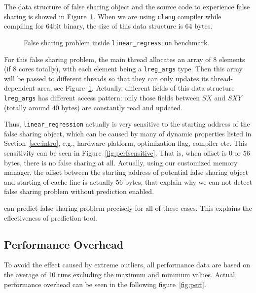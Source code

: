 The data structure of false sharing object and the source code
to experience false sharing is showed in Figure~\ref{fig:linearregression}. 
When we are using \texttt{clang} compiler while compiling for $64$bit binary, the size of this 
data structure is $64$ bytes.

\begin{figure}[!h]
{\centering
\subfigure{}
\caption{False sharing problem inside \texttt{linear\_regression} benchmark.
\label{fig:linearregression}}
}
\end{figure}

For this false sharing problem, the main thread allocates an array of $8$ elements 
(if $8$ cores totally), 
with each element being a \texttt{lreg\_args} type. 
Then this array will be passed to different threads so that they can only updates its 
thread-dependent area, see Figure~\ref{fig:linearregression}.
Actually, different fields of this data structure \texttt{lreg\_args} has different access pattern:
only those fields between $SX$ and $SXY$ (totally around $40$ bytes) are constantly read and updated.

Thus, \texttt{linear\_regression} actually is very sensitive to the starting address 
of the false sharing object, which can be caused by many of dynamic properties 
listed in Section~\ref{sec:intro}, e.g.,
hardware platform, optimization flag, compiler etc.
This sensitivity can be seen in Figure~\ref{fig:perfsensitive}.
That is, when offset is $0$ or $56$ bytes, there is no false sharing at all.
Actually, using our customized memory manager,
the offset between the starting address of potential false sharing object 
and starting of cache line is actually $56$ bytes,
that explain why we can not detect false sharing problem without prediction enabled.

 can predict false sharing problem precisely for all of these cases. This explains
the effectiveness of prediction tool.

\subsection{Performance Overhead}
\label{sec:perfoverhead}
To avoid the effect caused by extreme outliers,
all performance data are based on the average of 10 runs excluding the
maximum and minimum values.
Actual performance overhead can be seen in the following figure~\ref{fig:perf}. 

